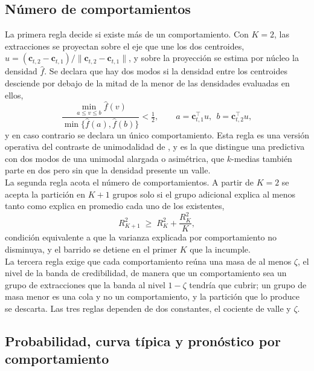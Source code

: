 \subsection{Número de comportamientos}
\label{03_06_02_numero}

La primera regla decide si existe más de un comportamiento. Con $K = 2$, las extracciones se proyectan sobre el eje que une los dos centroides, $u = (\mathbf{c}_{t,2} - \mathbf{c}_{t,1}) / \lVert \mathbf{c}_{t,2} - \mathbf{c}_{t,1} \rVert$, y sobre la proyección se estima por núcleo la densidad $\widehat{f}$. Se declara que hay dos modos si la densidad entre los centroides desciende por debajo de la mitad de la menor de las densidades evaluadas en ellos,
\begin{equation}\label{eq:valle}
    \frac{\min_{a \le v \le b} \widehat{f}(v)}{\min\bigl\{\widehat{f}(a), \widehat{f}(b)\bigr\}} < \tfrac{1}{2},
    \qquad a = \mathbf{c}_{t,1}^\top u,\ \ b = \mathbf{c}_{t,2}^\top u,
\end{equation}
y en caso contrario se declara un único comportamiento. Esta regla es una versión operativa del contraste de unimodalidad de \citet{03_05_hartigan1985dip}, y es la que distingue una predictiva con dos modos de una unimodal alargada o asimétrica, que $k$-medias también parte en dos pero sin que la densidad presente un valle.\\

La segunda regla acota el número de comportamientos. A partir de $K = 2$ se acepta la partición en $K + 1$ grupos solo si el grupo adicional explica al menos tanto como explica en promedio cada uno de los existentes,
\begin{equation}\label{eq:crecimiento}
    R^2_{K+1} \;\geq\; R^2_K + \frac{R^2_K}{K},
\end{equation}
condición equivalente a que la varianza explicada por comportamiento no disminuya, y el barrido se detiene en el primer $K$ que la incumple.\\

La tercera regla exige que cada comportamiento reúna una masa de al menos $\zeta$, el nivel de la banda de credibilidad, de manera que un comportamiento sea un grupo de extracciones que la banda al nivel $1-\zeta$ tendría que cubrir; un grupo de masa menor es una cola y no un comportamiento, y la partición que lo produce se descarta. Las tres reglas dependen de dos constantes, el cociente de valle y $\zeta$.

\subsection{Probabilidad, curva típica y pronóstico por comportamiento}
\label{03_06_03_descripcion}


